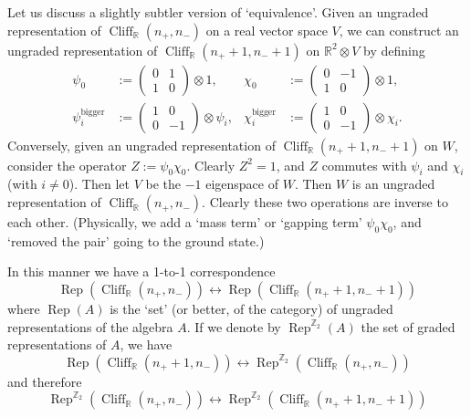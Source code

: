 \documentclass[12pt]{article}
\numberwithin{equation}{section}
\numberwithin{figure}{section}
\theoremstyle{remark}
\def\bR{\mathbb{R}}
\def\bZ{\mathbb{Z}}
\def\Cliff{\mathop{\mathrm{Cliff}}\nolimits}
\def\Rep{\mathop{\mathrm{Rep}}\nolimits}
\begin{document}
Let us discuss a slightly subtler version of `equivalence'. 
Given an ungraded representation of $\Cliff_\bR(n_+,n_-)$ on a real vector space $V$,
we can construct an ungraded representation of $\Cliff_\bR(n_++1,n_-+1)$ on $\bR^2\otimes V$
by defining \begin{equation}
\begin{aligned}
\psi_0&:=\begin{pmatrix}
0 & 1\\
1& 0
\end{pmatrix} \otimes 1,&
\chi_0&:=\begin{pmatrix}
0 & -1\\
1& 0
\end{pmatrix} \otimes 1,\\
\psi_i^\text{bigger}& :=\begin{pmatrix}
1 & 0\\
0 & -1
\end{pmatrix} \otimes \psi_i,&
\chi_i^\text{bigger}& :=\begin{pmatrix}
1 & 0\\
0 & -1
\end{pmatrix} \otimes \chi_i.
\end{aligned}
\end{equation}
Conversely, given an ungraded representation of 
$\Cliff_\bR(n_++1,n_-+1)$ on $W$,
consider the operator $Z:=\psi_0 \chi_0$. Clearly $Z^2=1$, and $Z$ commutes with $\psi_i$ and $\chi_i$ (with $i\neq 0$).
Then let $V$ be the $-1$ eigenspace of $W$.
Then $W$ is an ungraded representation of $\Cliff_\bR(n_+,n_-)$.
Clearly these two operations are inverse to each other.
(Physically, we add a `mass term' or `gapping term' $\psi_0 \chi_0$, 
and `removed the pair' going to the ground state.)

In this manner we have a 1-to-1 correspondence \begin{equation}
\Rep(\Cliff_\bR(n_+,n_-)) \leftrightarrow \Rep(\Cliff_\bR(n_++1,n_-+1)) 
\label{-}
\end{equation}
where $\Rep(A)$ is the `set' (or better, of the category) of ungraded representations of the algebra $A$.
If we denote by $\Rep^{\bZ_{2}}(A)$ the set of graded representations of $A$, we  have
\begin{equation}
\Rep(\Cliff_\bR(n_++1,n_-)) \leftrightarrow \Rep^{\bZ_2}(\Cliff_\bR(n_+,n_-)) 
\end{equation}
and therefore 
 \begin{equation}
\Rep^{\bZ_2}(\Cliff_\bR(n_+,n_-)) \leftrightarrow \Rep^{\bZ_2}(\Cliff_\bR(n_++1,n_-+1)) 
\end{equation}
\end{document}
